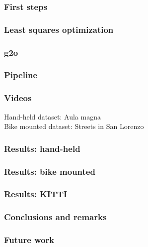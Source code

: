 \documentclass[11pt]{beamer}
\begin{document}
\begin{frame}
\frametitle{First steps}
\end{frame}

\begin{frame}
\frametitle{Least squares optimization}
\end{frame}

\begin{frame}
\frametitle{g2o}
\end{frame}

\begin{frame}
\frametitle{Pipeline}
\end{frame}

\begin{frame}
\frametitle{Videos}
Hand-held dataset: Aula magna\\
Bike mounted dataset: Streets in San Lorenzo
\end{frame}

\begin{frame}
\frametitle{Results: hand-held}
\end{frame}

\begin{frame}
\frametitle{Results: bike mounted}
\end{frame}

\begin{frame}
\frametitle{Results: KITTI}
\end{frame}

\begin{frame}
\frametitle{Conclusions and remarks}
\end{frame}

\begin{frame}
\frametitle{Future work}
\end{frame}
\end{document}
